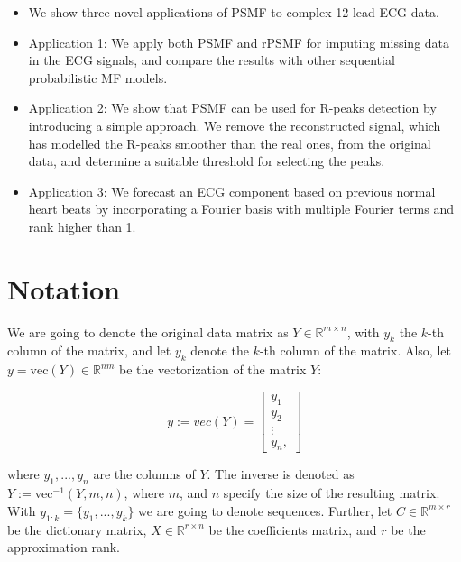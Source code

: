 \documentclass{mldsmsc}
\begin{document}
\begin{itemize}
    \item We show three novel applications of PSMF to complex 12-lead ECG data.
    \item Application 1: We apply both PSMF and rPSMF for imputing missing data in the ECG signals, and compare the results with other sequential probabilistic MF models.
    \item Application 2: We show that PSMF can be used for R-peaks detection by introducing a simple approach. We remove the reconstructed signal, which has modelled the R-peaks smoother than the real ones, from the original data, and determine a suitable threshold for selecting the peaks. 
    \item Application 3: We forecast an ECG component based on previous normal heart beats by incorporating a Fourier basis with multiple Fourier terms and rank higher than 1. 
\end{itemize}

\section{Notation}

We are going to denote the original data matrix as $Y \in \mathbb{R}^{m \times n}$, with $y_k$ the $k$-th column of the matrix, and let $y_k$ denote the $k$-th column of the matrix. Also, let $y = \text{vec}(Y) \in \mathbb{R}^{nm}$ be the vectorization of the matrix $Y$:

\begin{equation}
    y := vec(Y) = \begin{bmatrix}
        y_1 \\
        y_2 \\
        \vdots \\
        y_n, 
    \end{bmatrix}
\end{equation}

\noindent where $y_1, ..., y_n$ are the columns of $Y$. The inverse is denoted as $Y := \text{vec}^{-1}(Y, m, n)$, where $m$, and $n$ specify the size of the resulting matrix. With $y_{1:k} = \{y_1, ..., y_k\}$ we are going to denote sequences. Further, let $C \in \mathbb{R}^{m \times r}$ be the dictionary matrix, $X \in \mathbb{R}^{r \times n}$ be the coefficients matrix, and $r$ be the approximation rank. \newline
\end{document}

